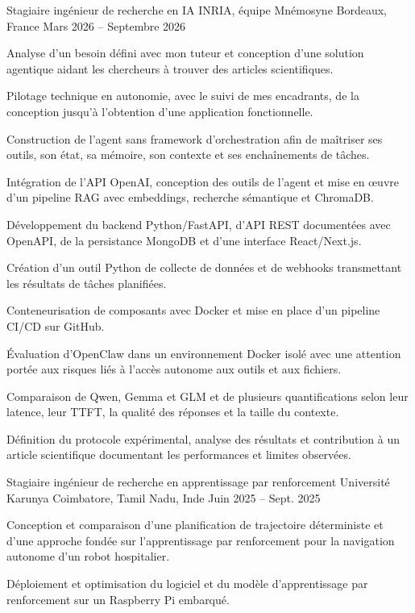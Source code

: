 
\begin{cventries}
  \cventry
    {Stagiaire ingénieur de recherche en IA}
    {INRIA, équipe Mnémosyne}
    {Bordeaux, France}
    {Mars 2026 -- Septembre 2026}
    {
      \begin{cvitems}
        \item {Analyse d’un besoin défini avec mon tuteur et conception d’une solution agentique aidant les chercheurs à trouver des articles scientifiques.}
        \item {Pilotage technique en autonomie, avec le suivi de mes encadrants, de la conception jusqu’à l’obtention d’une application fonctionnelle.}
        \item {Construction de l’agent sans framework d’orchestration afin de maîtriser ses outils, son état, sa mémoire, son contexte et ses enchaînements de tâches.}
        \item {Intégration de l’API OpenAI, conception des outils de l’agent et mise en œuvre d’un pipeline RAG avec embeddings, recherche sémantique et ChromaDB.}
        \item {Développement du backend Python/FastAPI, d’API REST documentées avec OpenAPI, de la persistance MongoDB et d’une interface React/Next.js.}
        \item {Création d’un outil Python de collecte de données et de webhooks transmettant les résultats de tâches planifiées.}
        \item {Conteneurisation de composants avec Docker et mise en place d’un pipeline CI/CD sur GitHub.}
        \item {Évaluation d’OpenClaw dans un environnement Docker isolé avec une attention portée aux risques liés à l’accès autonome aux outils et aux fichiers.}
        \item {Comparaison de Qwen, Gemma et GLM et de plusieurs quantifications selon leur latence, leur TTFT, la qualité des réponses et la taille du contexte.}
        \item {Définition du protocole expérimental, analyse des résultats et contribution à un article scientifique documentant les performances et limites observées.}
      \end{cvitems}
    }

  \cventry
    {Stagiaire ingénieur de recherche en apprentissage par renforcement}
    {Université Karunya}
    {Coimbatore, Tamil Nadu, Inde}
    {Juin 2025 -- Sept. 2025}
    {
      \begin{cvitems}
        \item {Conception et comparaison d’une planification de trajectoire déterministe et d’une approche fondée sur l’apprentissage par renforcement pour la navigation autonome d’un robot hospitalier.}
        \item {Déploiement et optimisation du logiciel et du modèle d’apprentissage par renforcement sur un Raspberry Pi embarqué.}
      \end{cvitems}
    }
\end{cventries}
